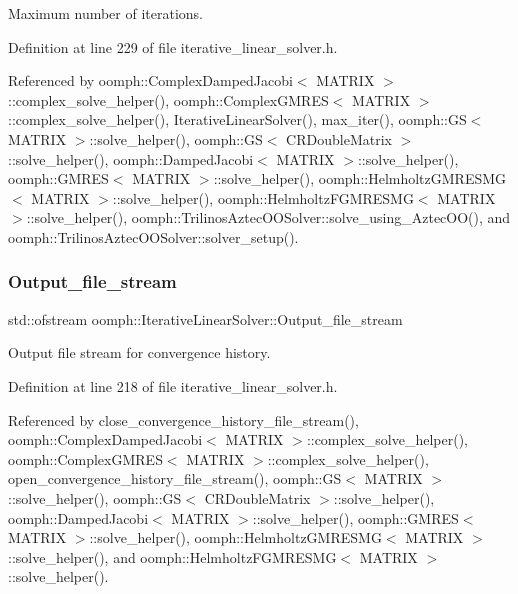 Maximum number of iterations. 



Definition at line 229 of file iterative\+\_\+linear\+\_\+solver.\+h.



Referenced by oomph\+::\+Complex\+Damped\+Jacobi$<$ M\+A\+T\+R\+I\+X $>$\+::complex\+\_\+solve\+\_\+helper(), oomph\+::\+Complex\+G\+M\+R\+E\+S$<$ M\+A\+T\+R\+I\+X $>$\+::complex\+\_\+solve\+\_\+helper(), Iterative\+Linear\+Solver(), max\+\_\+iter(), oomph\+::\+G\+S$<$ M\+A\+T\+R\+I\+X $>$\+::solve\+\_\+helper(), oomph\+::\+G\+S$<$ C\+R\+Double\+Matrix $>$\+::solve\+\_\+helper(), oomph\+::\+Damped\+Jacobi$<$ M\+A\+T\+R\+I\+X $>$\+::solve\+\_\+helper(), oomph\+::\+G\+M\+R\+E\+S$<$ M\+A\+T\+R\+I\+X $>$\+::solve\+\_\+helper(), oomph\+::\+Helmholtz\+G\+M\+R\+E\+S\+M\+G$<$ M\+A\+T\+R\+I\+X $>$\+::solve\+\_\+helper(), oomph\+::\+Helmholtz\+F\+G\+M\+R\+E\+S\+M\+G$<$ M\+A\+T\+R\+I\+X $>$\+::solve\+\_\+helper(), oomph\+::\+Trilinos\+Aztec\+O\+O\+Solver\+::solve\+\_\+using\+\_\+\+Aztec\+O\+O(), and oomph\+::\+Trilinos\+Aztec\+O\+O\+Solver\+::solver\+\_\+setup().

\mbox{\label{classoomph_1_1IterativeLinearSolver_ad4d6766bec67399c29392e6540b91dd9}} 
\subsubsection{\texorpdfstring{Output\+\_\+file\+\_\+stream}{Output\_file\_stream}}
{\footnotesize\ttfamily std\+::ofstream oomph\+::\+Iterative\+Linear\+Solver\+::\+Output\+\_\+file\+\_\+stream\hspace{0.3cm}{\ttfamily [protected]}}



Output file stream for convergence history. 



Definition at line 218 of file iterative\+\_\+linear\+\_\+solver.\+h.



Referenced by close\+\_\+convergence\+\_\+history\+\_\+file\+\_\+stream(), oomph\+::\+Complex\+Damped\+Jacobi$<$ M\+A\+T\+R\+I\+X $>$\+::complex\+\_\+solve\+\_\+helper(), oomph\+::\+Complex\+G\+M\+R\+E\+S$<$ M\+A\+T\+R\+I\+X $>$\+::complex\+\_\+solve\+\_\+helper(), open\+\_\+convergence\+\_\+history\+\_\+file\+\_\+stream(), oomph\+::\+G\+S$<$ M\+A\+T\+R\+I\+X $>$\+::solve\+\_\+helper(), oomph\+::\+G\+S$<$ C\+R\+Double\+Matrix $>$\+::solve\+\_\+helper(), oomph\+::\+Damped\+Jacobi$<$ M\+A\+T\+R\+I\+X $>$\+::solve\+\_\+helper(), oomph\+::\+G\+M\+R\+E\+S$<$ M\+A\+T\+R\+I\+X $>$\+::solve\+\_\+helper(), oomph\+::\+Helmholtz\+G\+M\+R\+E\+S\+M\+G$<$ M\+A\+T\+R\+I\+X $>$\+::solve\+\_\+helper(), and oomph\+::\+Helmholtz\+F\+G\+M\+R\+E\+S\+M\+G$<$ M\+A\+T\+R\+I\+X $>$\+::solve\+\_\+helper().

